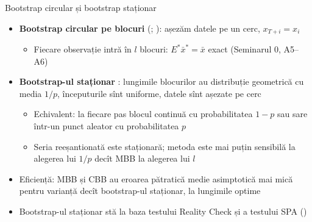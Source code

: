 \begin{frame}{Bootstrap circular și bootstrap staționar}
\itemsize{\footnotesize}
\begin{itemize}
    \item \textbf{Bootstrap circular pe blocuri} (; ): așezăm datele pe un cerc, $x_{T+i} = x_i$
    \begin{itemize}
        \item Fiecare observație intră în $l$ blocuri: $E^*\bar x^* = \bar x$ exact (Seminarul 0, A5--A6)
    \end{itemize}
    \item \textbf{Bootstrap-ul staționar} : lungimile blocurilor au distribuție geometrică cu media $1/p$, începuturile sînt uniforme, datele sînt așezate pe cerc
    \begin{itemize}
        \item Echivalent: la fiecare pas blocul continuă cu probabilitatea $1 - p$ sau sare într-un punct aleator cu probabilitatea $p$
        \item Seria reeșantionată este staționară; metoda este mai puțin sensibilă la alegerea lui $1/p$ decît MBB la alegerea lui $l$
    \end{itemize}
    \item Eficiență: MBB și CBB au eroarea pătratică medie asimptotică mai mică pentru varianță decît bootstrap-ul staționar, la lungimile optime 
    \item Bootstrap-ul staționar stă la baza testului Reality Check  și a testului SPA ()
\end{itemize}
\end{frame}

